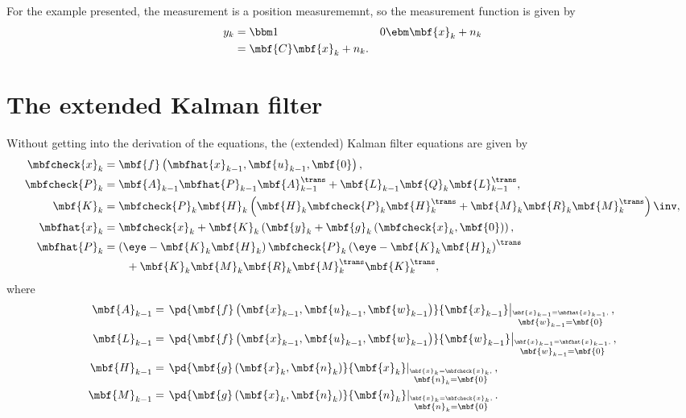 \documentclass[nobib]{tufte-handout}
\begin{document}
    For the example presented, the measurement is a position measurememnt, so the measurement function is given by
    \begin{align}
        y_{k} &= \bbm 1 & 0 \ebm\mbf{x}_{k} + n_{k}\\
        &= \mbf{C}\mbf{x}_{k} + n_{k}.
    \end{align}


    \section{The extended Kalman filter}
    Without getting into the derivation of the equations, the (extended) Kalman filter equations are given by \cite[eq.~(4.32)]{Barfoot_State_2017a}
    \begin{subequations}    
        \label{eq:EKF eqns}
        \begin{align}
            \label{eq:EKF: prediction}
            \mbfcheck{x}_{k} &= \mbf{f}\left( \mbfhat{x}_{k-1}, \mbf{u}_{k-1}, \mbf{0} \right), \\
            \label{eq:EKF: prediction cov}
            \mbfcheck{P}_{k} &= \mbf{A}_{k-1}\mbfhat{P}_{k-1}\mbf{A}_{k-1}^{\trans} + \mbf{L}_{k-1}\mbf{Q}_{k}\mbf{L}_{k-1}^{\trans},\\
            \label{eq:EKF: KF gain}
            \mbf{K}_{k} &= \mbfcheck{P}_{k}\mbf{H}_{k}\left( \mbf{H}_{k}\mbfcheck{P}_{k}\mbf{H}_{k}^{\trans} + \mbf{M}_{k}\mbf{R}_{k}\mbf{M}_{k}^{\trans} \right)\inv,\\
            \label{eq:EKF: correction}
            \mbfhat{x}_{k} &= \mbfcheck{x}_{k} + \mbf{K}_{k}\left( \mbf{y}_{k} + \mbf{g}_{k}\left( \mbfcheck{x}_{k}, \mbf{0} \right) \right),\\
            \label{eq:EKF: correction cov}
            \mbfhat{P}_{k} &= \left( \eye - \mbf{K}_{k}\mbf{H}_{k} \right)\mbfcheck{P}_{k}\left( \eye - \mbf{K}_{k}\mbf{H}_{k} \right)^{\trans} \nonumber\\&\qquad+ \mbf{K}_{k}\mbf{M}_{k}\mbf{R}_{k}\mbf{M}_{k}^{\trans}\mbf{K}_{k}^{\trans},
        \end{align}
    \end{subequations}
    where 
    \begin{align}
        \mbf{A}_{k-1} &= \left.\pd{\mbf{f}\left( \mbf{x}_{k-1}, \mbf{u}_{k-1}, \mbf{w}_{k-1} \right)}{\mbf{x}_{k-1}}\right|_{\overset{\mbf{x}_{k-1}=\mbfhat{x}_{k-1},}{\mbf{w}_{k-1}=\mbf{0}}},\\
        \mbf{L}_{k-1} &= \left.\pd{\mbf{f}\left( \mbf{x}_{k-1}, \mbf{u}_{k-1}, \mbf{w}_{k-1} \right)}{\mbf{w}_{k-1}}\right|_{\overset{\mbf{x}_{k-1}=\mbfhat{x}_{k-1},}{\mbf{w}_{k-1}=\mbf{0}}},\\
        \mbf{H}_{k-1} &= \left.\pd{\mbf{g}\left( \mbf{x}_{k}, \mbf{n}_{k} \right)}{\mbf{x}_{k}}\right|_{\overset{\mbf{x}_{k}=\mbfcheck{x}_{k},}{\mbf{n}_{k}=\mbf{0}}},\\
        \mbf{M}_{k-1} &= \left.\pd{\mbf{g}\left( \mbf{x}_{k}, \mbf{n}_{k} \right)}{\mbf{n}_{k}}\right|_{\overset{\mbf{x}_{k}=\mbfcheck{x}_{k},}{\mbf{n}_{k}=\mbf{0}}}.
    \end{align}
\end{document}

